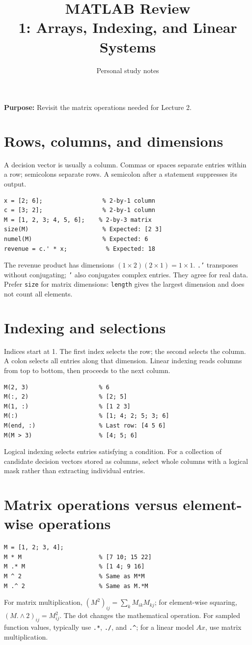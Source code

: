 \documentclass[11pt,a4paper]{article}
\title{\textbf{MATLAB Review}\\[2mm]\large 1: Arrays, Indexing, and Linear Systems}
\author{Personal study notes}
\date{}
\begin{document}
\maketitle
\noindent\textbf{Purpose:} Revisit the matrix operations needed for Lecture 2.
\tableofcontents

\section{Rows, columns, and dimensions}\label{sec:arrays}
A decision vector is usually a column. Commas or spaces separate entries within
a row; semicolons separate rows. A semicolon after a statement suppresses its output.
\begin{lstlisting}
x = [2; 6];                 % 2-by-1 column
c = [3; 2];                 % 2-by-1 column
M = [1, 2, 3; 4, 5, 6];    % 2-by-3 matrix
size(M)                     % Expected: [2 3]
numel(M)                    % Expected: 6
revenue = c.' * x;           % Expected: 18
\end{lstlisting}
The revenue product has dimensions $(1\times2)(2\times1)=1\times1$.
\texttt{.'} transposes without conjugating; \texttt{'} also conjugates complex
entries. They agree for real data. Prefer \texttt{size} for matrix dimensions:
\texttt{length} gives the largest dimension and does not count all elements.

\section{Indexing and selections}\label{sec:indexing}
Indices start at 1. The first index selects the row; the second selects the column.
A colon selects all entries along that dimension. Linear indexing reads columns
from top to bottom, then proceeds to the next column.
\begin{lstlisting}
M(2, 3)                    % 6
M(:, 2)                    % [2; 5]
M(1, :)                    % [1 2 3]
M(:)                       % [1; 4; 2; 5; 3; 6]
M(end, :)                  % Last row: [4 5 6]
M(M > 3)                   % [4; 5; 6]
\end{lstlisting}
Logical indexing selects entries satisfying a condition. For a collection of
candidate decision vectors stored as columns, select whole columns with a logical
mask rather than extracting individual entries.

\section{Matrix operations versus element-wise operations}\label{sec:operations}
\begin{lstlisting}
M = [1, 2; 3, 4];
M * M                      % [7 10; 15 22]
M .* M                     % [1 4; 9 16]
M ^ 2                      % Same as M*M
M .^ 2                     % Same as M.*M
\end{lstlisting}
For matrix multiplication,
$(M^2)_{ij}=\sum_k M_{ik}M_{kj}$; for element-wise squaring,
$(M\mathbin{.\!\wedge}2)_{ij}=M_{ij}^2$. The dot changes the mathematical operation.
For sampled function values, typically use \texttt{.*}, \texttt{./}, and
\texttt{.\^}; for a linear model $Ax$, use matrix multiplication.
\end{document}

